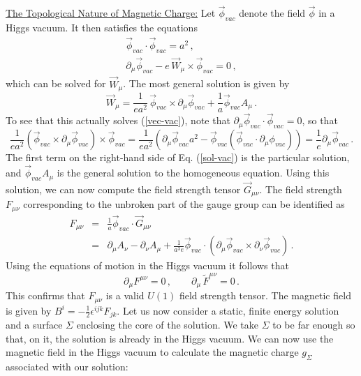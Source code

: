 \noindent\underline{The Topological Nature of Magnetic Charge:}
\noindent Let $\vec{\phi}_{vac}$ denote the field $\vec{\phi}$ in a
Higgs vacuum. It then satisfies the equations
\begin{eqnarray}
&\vec{\phi}_{vac}\cdot\vec{\phi}_{vac} = a^2\,, &\nonumber \\
&\partial_{\mu} \vec{\phi}_{vac}-e\,\vec{W}_{\mu} \times
\vec{\phi}_{vac} = 0\,,& 
\label{vec-vac}
\end{eqnarray}
which can be solved for $\vec{W}_\mu$. The most general solution is
given by 
\begin{equation}
\vec{W}_{\mu} = \frac{1}{ea^{2}}\, \vec{\phi}_{vac} \times
\partial_\mu\vec{\phi}_{vac}+\frac{1}{a}\vec{\phi}_{vac}A_{\mu}\,.
\label{sol-vac}
\end{equation}
To see that this actually solves (\ref{vec-vac}), note that 
$\partial_\mu\vec{\phi}_{vac}\cdot\vec{\phi}_{vac}=0$, so that
$$
\frac{1}{ea^2}(\vec{\phi}_{vac}\times\partial_{\mu}\vec{\phi}_{vac})
\times \vec{\phi}_{vac}= \frac{1}{ea^2}\left(\partial_\mu\vec{\phi}_{vac}a^2
-\vec{\phi}_{vac} (\vec{\phi}_{vac}\cdot\partial_\mu\phi_{vac})\right)= 
\frac{1}{e}\partial_\mu\vec{\phi}_{vac}\,.
$$
The first term on the right-hand side of Eq. (\ref{sol-vac}) is the
particular solution, and $\vec{\phi}_{vac} A_\mu$ is the general
solution to the homogeneous equation. Using this solution, we can now
compute the field strength tensor $\vec{G}_{\mu\nu}$. The field
strength $F_{\mu\nu}$ corresponding to the unbroken part of the gauge
group can be identified as  
\begin{eqnarray}
F_{\mu\nu}&=&\frac{1}{a}\vec{\phi}_{vac}\cdot\vec{G}_{\mu \nu}
\nonumber\\
&=&\partial_\mu A_\nu -\partial_\nu A_\mu +
\frac{1}{a^3 e}\vec{\phi}_{vac}\cdot (\partial_\mu\vec{\phi}_{vac}
\times\partial_\nu\vec{\phi}_{vac})\,.
\label{F-vac}
\end{eqnarray}
Using the equations of motion in the Higgs vacuum it follows that  
$$
\partial_\mu F^{\mu\nu}=0\,,\qquad \partial_\mu\,\widetilde F^{\mu\nu}=0\,.
$$
This confirms that $F_{\mu\nu}$ is a valid $U(1)$ field strength
tensor. The magnetic field is given by
$B^i=-\frac{1}{2}\epsilon^{ijk}F_{jk}$. Let us now consider a static,
finite energy solution and a surface $\Sigma$ enclosing the core of
the solution. We take $\Sigma$ to be far enough so that, on it, the
solution is already in the Higgs vacuum. We can now use the magnetic
field in the Higgs vacuum to calculate the magnetic charge $g_\Sigma$
associated with our solution: 
